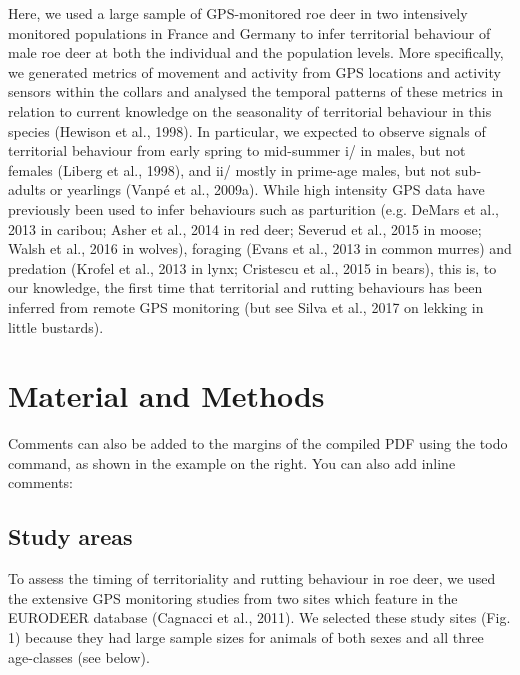 \documentclass[a4paper,11pt]{article}
\begin{document}
Here, we used a large sample of GPS-monitored roe deer in two intensively monitored populations in France and Germany to infer territorial behaviour of male roe deer at both the individual and the population levels. More specifically, we generated metrics of movement and activity from GPS locations and activity sensors within the collars and analysed the temporal patterns of these metrics in relation to current knowledge on the seasonality of territorial behaviour in this species (Hewison et al., 1998). In particular, we expected to observe signals of territorial behaviour from early spring to mid-summer i/ in males, but not females (Liberg et al., 1998), and ii/ mostly in prime-age males, but not sub-adults or yearlings (Vanpé et al., 2009a). While high intensity GPS data have previously been used to infer behaviours such as parturition (e.g. DeMars et al., 2013 in caribou; Asher et al., 2014 in red deer; Severud et al., 2015 in moose; Walsh et al., 2016 in wolves), foraging (Evans et al., 2013 in common murres) and predation (Krofel et al., 2013 in lynx; Cristescu et al., 2015 in bears), this is, to our knowledge, the first time that territorial and rutting behaviours has been inferred from remote GPS monitoring (but see Silva et al., 2017 on lekking in little bustards).

\section{Material and Methods}


%
%
%
Comments can also be added to the margins of the compiled PDF using the todo command, as shown in the example on the right. You can also add inline comments:


\subsection{Study areas}
To assess the timing of territoriality and rutting behaviour in roe deer, we used the extensive GPS monitoring studies from two sites which feature in the EURODEER database (Cagnacci et al., 2011). We selected these study sites (Fig. 1) because they had large sample sizes for animals of both sexes and all three age-classes (see below). 
\end{document}
